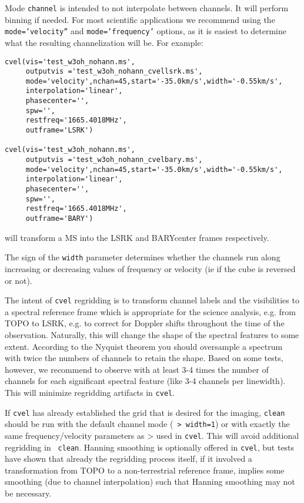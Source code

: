 Mode {\tt channel} is intended to not interpolate between channels. It
will perform binning if needed.  For most scientific applications we
recommend using the {\tt mode='velocity''} and {\tt mode='frequency'}
options, as it is easiest to determine what the resulting
channelization will be. For example: \small
\begin{verbatim}
cvel(vis='test_w3oh_nohann.ms',
     outputvis ='test_w3oh_nohann_cvellsrk.ms',
     mode='velocity',nchan=45,start='-35.0km/s',width='-0.55km/s',
     interpolation='linear',
     phasecenter='',
     spw='',
     restfreq='1665.4018MHz',
     outframe='LSRK')

cvel(vis='test_w3oh_nohann.ms',
     outputvis ='test_w3oh_nohann_cvelbary.ms',
     mode='velocity',nchan=45,start='-35.0km/s',width='-0.55km/s',
     interpolation='linear',
     phasecenter='',
     spw='',
     restfreq='1665.4018MHz',
     outframe='BARY')

\end{verbatim}
\normalsize will transform a MS into the LSRK and BARYcenter frames
respectively.  

The sign of the {\tt width} parameter determines whether the channels
run along increasing or decreasing values of frequency or velocity (ie
if the cube is reversed or not). 



The intent of {\tt cvel} regridding is to transform channel labels and
the visibilities to a spectral reference frame which is appropriate
for the science analysis, e.g. from TOPO to LSRK, e.g. to correct for
Doppler shifts throughout the time of the observation. Naturally,
this will change the shape of the spectral features to some
extent. According to the Nyquist theorem you should oversample a
spectrum with twice the numbers of channels to retain the
shape. Based on some tests, however, we recommend to observe with at
least 3-4 times the number of channels for each significant spectral
feature (like 3-4 channels per linewidth). This will minimize
regridding artifacts in {\tt cvel}.  

If {\tt cvel} has already established the grid that is desired for the
imaging, {\tt clean} should be run with the default channel mode ({\tt
  > width=1}) or with exactly the same frequency/velocity parameters
as > used in {\tt cvel}. This will avoid additional regridding in {\tt
  clean}. Hanning smoothing is optionally offered in {\tt cvel}, but
tests have shown that already the regridding process itself, if it
involved a transformation from TOPO to a non-terrestrial reference
frame, implies some smoothing (due to channel interpolation) such that
Hanning smoothing may not be necessary.





